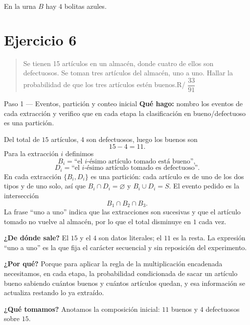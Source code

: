 \documentclass[11pt]{article}
\begin{document}
\begin{resp}
En la urna $B$ hay $4$ bolitas azules.
\end{resp}

\section*{Ejercicio 6}

\begin{quote}
Se tienen 15 artículos en un almacén, donde cuatro de ellos son defectuosos. Se toman tres artículos del almacén, uno a uno. Hallar la probabilidad de que los tres artículos estén buenos.\hfill R/ $\dfrac{33}{91}$
\end{quote}

\begin{paso}{Paso 1 --- Eventos, partición y conteo inicial}
\textbf{Qué hago:} nombro los eventos de cada extracción y verifico que en cada etapa la clasificación en bueno/defectuoso es una partición.

Del total de $15$ artículos, $4$ son defectuosos, luego los buenos son
\[
15-4=11 .
\]
Para la extracción $i$ definimos
\[
B_i=\text{``el $i$-ésimo artículo tomado está bueno''},
\]
\[
D_i=\text{``el $i$-ésimo artículo tomado es defectuoso''}.
\]
En cada extracción $\{B_i,D_i\}$ es una partición: cada artículo es de uno de los dos tipos y de uno solo, así que $B_i\cap D_i=\varnothing$ y $B_i\cup D_i=S$. El evento pedido es la intersección
\[
B_1\cap B_2\cap B_3 .
\]
La frase ``uno a uno'' indica que las extracciones son sucesivas y que el artículo tomado no vuelve al almacén, por lo que el total disminuye en $1$ cada vez.

\textbf{¿De dónde sale?} El $15$ y el $4$ son datos literales; el $11$ es la resta. La expresión ``uno a uno'' es la que fija el carácter secuencial y sin reposición del experimento.

\textbf{¿Por qué?} Porque para aplicar la regla de la multiplicación encadenada necesitamos, en cada etapa, la probabilidad condicionada de sacar un artículo bueno sabiendo cuántos buenos y cuántos artículos quedan, y esa información se actualiza restando lo ya extraído.

\textbf{¿Qué tomamos?} Anotamos la composición inicial: $11$ buenos y $4$ defectuosos sobre $15$.
\end{paso}
\end{document}

